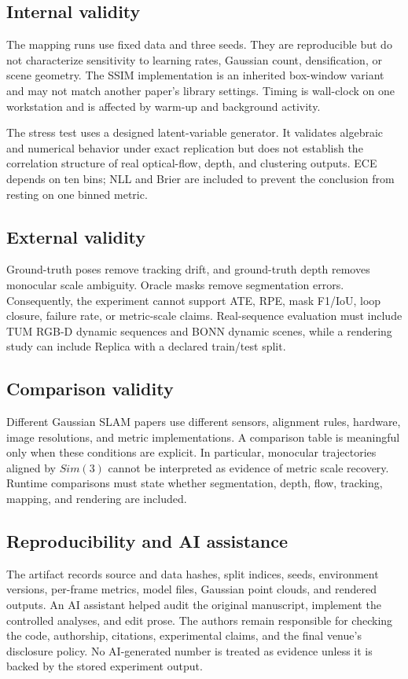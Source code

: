 \documentclass[10pt,conference]{IEEEtran}
\begin{document}
\subsection{Internal validity}
The mapping runs use fixed data and three seeds. They are reproducible but do not characterize sensitivity to learning rates, Gaussian count, densification, or scene geometry. The SSIM implementation is an inherited box-window variant and may not match another paper's library settings. Timing is wall-clock on one workstation and is affected by warm-up and background activity.

The stress test uses a designed latent-variable generator. It validates algebraic and numerical behavior under exact replication but does not establish the correlation structure of real optical-flow, depth, and clustering outputs. ECE depends on ten bins; NLL and Brier are included to prevent the conclusion from resting on one binned metric.

\subsection{External validity}
Ground-truth poses remove tracking drift, and ground-truth depth removes monocular scale ambiguity. Oracle masks remove segmentation errors. Consequently, the experiment cannot support ATE, RPE, mask F1/IoU, loop closure, failure rate, or metric-scale claims. Real-sequence evaluation must include TUM RGB-D dynamic sequences and BONN dynamic scenes, while a rendering study can include Replica with a declared train/test split.

\subsection{Comparison validity}
Different Gaussian SLAM papers use different sensors, alignment rules, hardware, image resolutions, and metric implementations. A comparison table is meaningful only when these conditions are explicit. In particular, monocular trajectories aligned by $Sim(3)$ cannot be interpreted as evidence of metric scale recovery. Runtime comparisons must state whether segmentation, depth, flow, tracking, mapping, and rendering are included.

\subsection{Reproducibility and AI assistance}
The artifact records source and data hashes, split indices, seeds, environment versions, per-frame metrics, model files, Gaussian point clouds, and rendered outputs. An AI assistant helped audit the original manuscript, implement the controlled analyses, and edit prose. The authors remain responsible for checking the code, authorship, citations, experimental claims, and the final venue's disclosure policy. No AI-generated number is treated as evidence unless it is backed by the stored experiment output.
\end{document}
